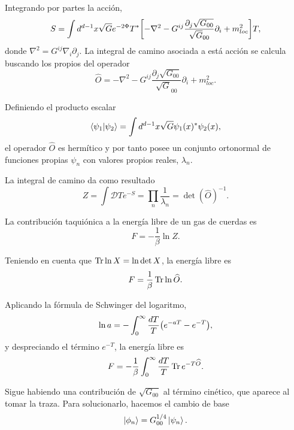 Integrando por partes la acción,
\begin{equation}
  S = \int d^{d-1} x \sqrt G e^{-2\Phi} T^* \qty[-\nabla^2-G^{ij}\frac{\partial_j \sqrt{G_{00}}}{\sqrt G_{00}}\partial_i + m^2_{loc}]T,
\end{equation}
donde $\nabla^2 = G^{ij}\nabla_i \partial_j$.
La integral de camino asociada a está acción se calcula buscando los
propios del operador 
\begin{equation}
  \widehat{O} =-\nabla^2-G^{ij}\frac{\partial_j \sqrt{G_{00}}}{\sqrt G_{00}}\partial_i + m^2_{loc}.
\end{equation}

Definiendo el producto escalar
\begin{equation}
  \braket{\psi_1}{\psi_2} = \int d^{d-1} x \sqrt G \psi_1(x)^* \psi_2(x),
\end{equation}
el operador $\widehat O$ es hermítico y por tanto posee un conjunto ortonormal de funciones
propias $\psi_n$ con valores propios reales, $\lambda_n$.

La integral de camino da como resultado
\begin{equation}
  Z=\int \mathcal D T e^{-S} =\prod_n \frac{1}{\lambda_n} = \det(\widehat O)^{-1}.
\end{equation}

La contribución taquiónica a la energía libre de un gas de cuerdas es
\begin{equation}
  F=-\frac{1}{\beta}\ln Z. 
\end{equation}

Teniendo en cuenta que $\Tr \ln X = \ln \det X$, la energía libre es
\begin{equation}
  F=\frac{1}{\beta} \Tr \ln \widehat O.
\end{equation}

Aplicando la fórmula de Schwinger del logaritmo, 
\begin{equation}
  \ln a = -\int_0^\infty \frac{dT}{T}\qty(e^{-aT}-e^{-T}),
\end{equation}
y despreciando el término $e^{-T}$, la energía libre es
\begin{equation}
  F=-\frac{1}{\beta}\int_0^\infty \frac{dT}{T} \Tr e^{-T\widehat O}.
  \label{eq:fO}
\end{equation}

Sigue habiendo una contribución de $\sqrt{G_{00}}$ al término cinético, que aparece al tomar la traza.
Para solucionarlo, hacemos el cambio de base
\begin{equation}
  \ket{\phi_n}=G_{00}^{1/4}  \ket{\psi_n}.
\end{equation}

